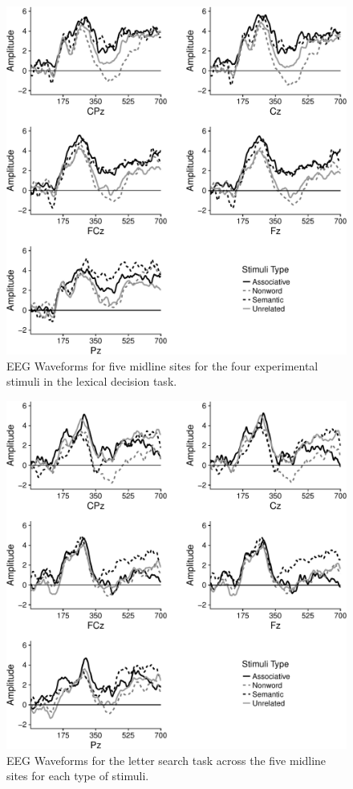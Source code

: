 \documentclass[english,man]{apa6}
\theoremstyle{definition}
\theoremstyle{definition}
\theoremstyle{definition}
\theoremstyle{remark}
\begin{document}
\begin{figure}
\centering
\includegraphics{BrainPaper_files/figure-latex/graph-LDT-1.pdf}
\caption{\label{fig:graph-LDT}EEG Waveforms for five midline sites for the
four experimental stimuli in the lexical decision task.}
\end{figure}

\begin{figure}
\centering
\includegraphics{BrainPaper_files/figure-latex/graph-LST-1.pdf}
\caption{\label{fig:graph-LST}EEG Waveforms for the letter search task
across the five midline sites for each type of stimuli.}
\end{figure}
\end{document}
